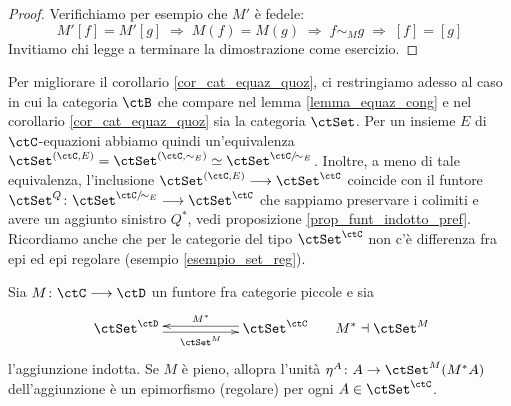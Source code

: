 \begin{proof}
 Verifichiamo per esempio che \(M'\) è fedele:
 \[M'\left[f\right] = M'\left[g\right] \;\Rightarrow\; M(f) = M(g) \;\Rightarrow\; f \sim_M g \;\Rightarrow\; \left[f\right] = \left[g\right]\]
 Invitiamo chi legge a terminare la dimostrazione come esercizio.
\end{proof}

%

\begin{remark}\label{oss_restr_quot_pref}
 Per migliorare il corollario \ref{cor_cat_equaz_quoz}, ci restringiamo adesso al caso in cui la categoria \(\ctB\) che
 compare nel lemma \ref{lemma_equaz_cong} e nel corollario \ref{cor_cat_equaz_quoz} sia la
 categoria \(\ctSet\). Per un insieme \(E\) di \(\ctC\)-equazioni abbiamo quindi un'equivalenza
 \(\ctSet^{(\ctC,E)} = \ctSet^{(\ctC,\sim_E)} \simeq \ctSet^{\ctC/{\!\sim_E}}\). Inoltre, a meno di tale equivalenza, l'inclusione
 \(\ctSet^{(\ctC,E)} \fun \ctSet^\ctC\) coincide con il funtore \(\ctSet^Q \colon \ctSet^{\ctC/{\!\sim_E}} \fun \ctSet^\ctC\) che
 sappiamo preservare i colimiti e avere un aggiunto sinistro \(Q^*\), vedi proposizione \ref{prop_funt_indotto_pref}.
 Ricordiamo anche che per le categorie del tipo \(\ctSet^\ctC\) non c'è differenza fra epi ed epi regolare (esempio
 \ref{esempio_set_reg}).
\end{remark}

\begin{lemma}\label{lemma_unita_agg_ind}
 Sia \(M \colon \ctC \fun \ctD\) un funtore fra categorie piccole e sia
 \[\xymatrix{ \ctSet^\ctD \ar@<-0.5ex>[rr]_-{\ctSet^M} & & \ctSet^\ctC \ar@<-0.5ex>[ll]_-{M^*} } \;\;\;\;\;\; M^* \dashv \ctSet^M\]
 l'aggiunzione indotta. Se \(M\) è pieno, allopra l'unità \(\eta^A \colon A \to \ctSet^M(M^*A)\) dell'aggiunzione è un
 epimorfismo (regolare) per ogni \(A \in \ctSet^\ctC\).
\end{lemma}

